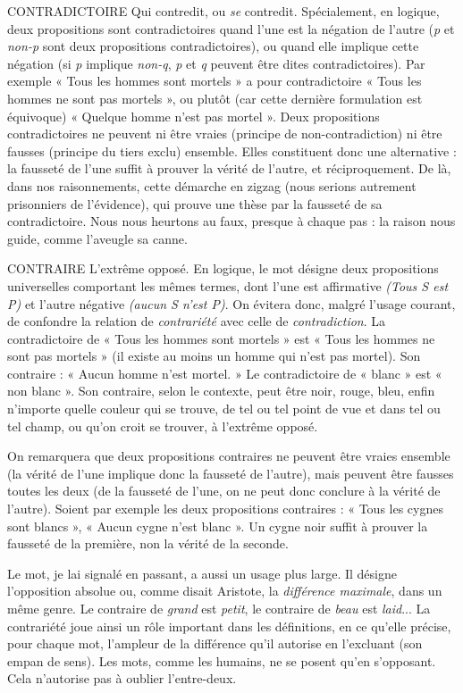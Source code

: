 CONTRADICTOIRE Qui contredit, ou {\it se} contredit. Spécialement, en
logique, deux propositions sont contradictoires quand
l'une est la négation de l’autre ({\it p} et {\it non-p} sont deux propositions contradictoires),
ou quand elle implique cette négation (si {\it p} implique {\it non-q}, {\it p} et {\it q} peuvent
être dites contradictoires). Par exemple « Tous les hommes sont mortels »
a pour contradictoire « Tous les hommes ne sont pas mortels », ou plutôt (car
cette dernière formulation est équivoque) « Quelque homme n’est pas mortel ».
Deux propositions contradictoires ne peuvent ni être vraies (principe de non-contradiction)
ni être fausses (principe du tiers exclu) ensemble. Elles constituent
donc une alternative : la fausseté de l’une suffit à prouver la vérité de
l’autre, et réciproquement. De là, dans nos raisonnements, cette démarche en
zigzag (nous serions autrement prisonniers de l’évidence), qui prouve une thèse
par la fausseté de sa contradictoire. Nous nous heurtons au faux, presque à
chaque pas : la raison nous guide, comme l’aveugle sa canne.

CONTRAIRE  L’extrême opposé. En logique, le mot désigne deux propositions
universelles comportant les mêmes termes, dont l’une
est affirmative {\it (Tous S est P)} et l’autre négative {\it (aucun S n'est P)}. On évitera
donc, malgré l’usage courant, de confondre la relation de {\it contrariété} avec celle
de {\it contradiction}. La contradictoire de « Tous les hommes sont mortels » est
« Tous les hommes ne sont pas mortels » (il existe au moins un homme qui
n’est pas mortel). Son contraire : « Aucun homme n’est mortel. » Le contradictoire
de « blanc » est « non blanc ». Son contraire, selon le contexte, peut être
noir, rouge, bleu, enfin n'importe quelle couleur qui se trouve, de tel ou tel
point de vue et dans tel ou tel champ, ou qu’on croit se trouver, à l'extrême
opposé.

On remarquera que deux propositions contraires ne peuvent être vraies
ensemble (la vérité de l’une implique donc la fausseté de l’autre), mais peuvent
être fausses toutes les deux (de la fausseté de l’une, on ne peut donc
conclure à la vérité de l’autre). Soient par exemple les deux propositions
contraires : « Tous les cygnes sont blancs », « Aucun cygne n’est blanc ». Un
cygne noir suffit à prouver la fausseté de la première, non la vérité de la
seconde.

Le mot, je lai signalé en passant, a aussi un usage plus large. Il désigne
l'opposition absolue ou, comme disait Aristote, la {\it différence maximale}, dans un
même genre. Le contraire de {\it grand} est {\it petit}, le contraire de {\it beau} est {\it laid}... La
contrariété joue ainsi un rôle important dans les définitions, en ce qu’elle précise,
pour chaque mot, l’ampleur de la différence qu’il autorise en l’excluant
(son empan de sens). Les mots, comme les humains, ne se posent qu’en s’opposant.
Cela n’autorise pas à oublier l’entre-deux.


